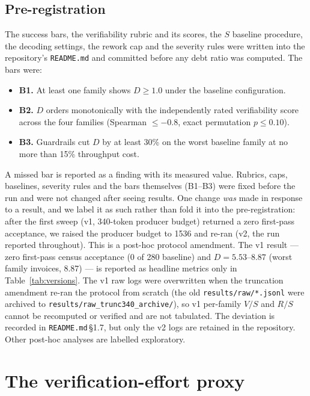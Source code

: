\documentclass[11pt]{article}
\newcommand{\D}{\ensuremath{D}}
\newcommand{\SV}{\ensuremath{S}}
\newcommand{\VV}{\ensuremath{V}}
\newcommand{\RV}{\ensuremath{R}}
\begin{document}
\subsection{Pre-registration}
\label{sec:prereg}

The success bars, the verifiability rubric and its scores, the $\SV$ baseline procedure, the
decoding settings, the rework cap and the severity rules were written into the repository's
\texttt{README.md} and committed before any debt ratio was computed. The bars were:

\begin{itemize}
\item \textbf{B1.} At least one family shows $\D\geq 1.0$ under the baseline configuration.
\item \textbf{B2.} $\D$ orders monotonically with the independently rated verifiability score
across the four families (Spearman $\leq-0.8$, exact permutation $p\leq0.10$).
\item \textbf{B3.} Guardrails cut $\D$ by at least 30\% on the worst baseline family at no more
than 15\% throughput cost.
\end{itemize}

A missed bar is reported as a finding with its measured value. Rubrics, caps, baselines, severity
rules and the bars themselves (B1--B3) were fixed before the run and were not changed after seeing
results. One change \emph{was} made in response to a result, and we label it as such rather than
fold it into the pre-registration: after the first sweep (v1, 340-token producer budget) returned a
zero first-pass acceptance, we raised the producer budget to 1536 and re-ran (v2, the run reported
throughout). This is a post-hoc protocol amendment. The v1 result --- zero first-pass census
acceptance (0 of 280 baseline) and $\D=5.53$--$8.87$ (worst family invoices, 8.87) --- is reported
as headline metrics only in Table~\ref{tab:versions}. The v1 raw logs were overwritten when the
truncation amendment re-ran the protocol from scratch (the old \texttt{results/raw/*.jsonl} were
archived to \texttt{results/raw\_trunc340\_archive/}), so v1 per-family $\VV/\SV$ and $\RV/\SV$
cannot be recomputed or verified and are not tabulated. The deviation is recorded in
\texttt{README.md}\,\S1.7, but only the v2 logs are retained in the repository. Other post-hoc
analyses are labelled exploratory.

\section{The verification-effort proxy}
\label{sec:proxy}
\end{document}

